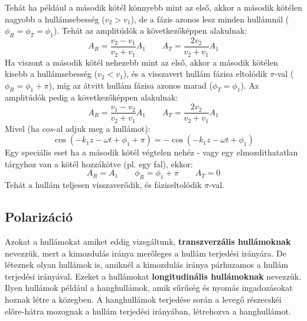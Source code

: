 \documentclass[../main.tex]{subfiles}
\begin{document}
Tehát ha például a második kötél könnyebb mint az első, akkor a második kötélen nagyobb a hullámsebesség ($v_2 > v_1$), de a fázis azonos lesz minden hullámnál ($\phi_R = \phi_T = \phi_1$).
Tehát az amplitúdók a következőképpen alakulnak:
\begin{equation}
    A_R = \frac{v_2 - v_1}{v_2 + v_1} A_1 \qquad A_T = \frac{2 v_2}{v_2 + v_1} A_1
\end{equation}
Ha viszont a második kötél nehezebb mint az első, akkor a második kötélen kisebb a hullámsebesség ($v_2 < v_1$), és a visszavert hullám fázisa eltolódik $\pi$-val ($\phi_R = \phi_1 + \pi$), míg az átvitt hullám fázisa
azonos marad ($\phi_T = \phi_1$). Az amplitúdók pedig a következőképpen alakulnak:
\begin{equation}
    A_R = \frac{v_1 - v_2}{v_2 + v_1} A_1 \qquad A_T = \frac{2 v_2}{v_2 + v_1} A_1
\end{equation}
Mivel (ha $cos$-al adjuk meg a hullámot):
\begin{equation}
    \cos(- k_1z - \omega t + \phi_1 + \pi) = - \cos(-k_1z - \omega t + \phi_1)
\end{equation}
Egy speciális eset ha a második kötél végtelen nehéz - vagy egy elmozdithatatlan tárgyhoz van a kötél hozzákötve (pl. egy fal), ekkor:
\begin{equation}
    A_R = A_1 \qquad \phi_R = \phi_1 + \pi \qquad A_T = 0
\end{equation}
Tehát a hullám teljesen visszaverődik, és fáziseltolódik $\pi$-val.

\subsection{Polarizáció}
Azokat a hullámokat amiket eddig vizsgáltunk, \textbf{transzverzális hullámoknak} nevezzük, mert a kimozdulás iránya merőleges a hullám terjedési irányára. De léteznek olyan hullámok is, amiknél a kimozdulás iránya párhuzamos a hullám terjedési irányával.
Ezeket a hullámokat \textbf{longitudinális hullámoknak} nevezzük. Ilyen hullámok például a hanghullámok, amik sűrűség és nyomás ingadozásokat hoznak létre a közegben. A hanghullámok terjedése során a levegő részecskéi előre-hátra mozognak
a hullám terjedési irányában, létrehozva a hanghullámot.
\end{document}
